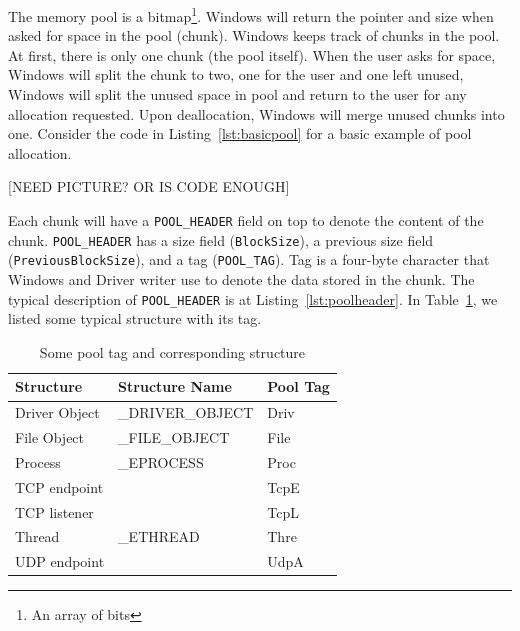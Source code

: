 The memory pool is a bitmap\footnote{An array of bits}. Windows will return the pointer and size when asked for space in the pool (chunk). Windows keeps track of chunks in the pool. At first, there is only one chunk (the pool itself). When the user asks for space, Windows will split the chunk to two, one for the user and one left unused, Windows will split the unused space in pool and return to the user for any allocation requested. Upon deallocation, Windows will merge unused chunks into one. Consider the code in Listing~\ref{lst:basicpool} for a basic example of pool allocation.

[NEED PICTURE? OR IS CODE ENOUGH]

Each chunk will have a \texttt{POOL\_HEADER} field on top to denote the content of the chunk. \texttt{POOL\_HEADER} has a size field (\texttt{BlockSize}), a previous size field (\texttt{PreviousBlockSize}), and a tag (\texttt{POOL\_TAG}). Tag is a four-byte character that Windows and Driver writer use to denote the data stored in the chunk. The typical description of \texttt{POOL\_HEADER} is at Listing~\ref{lst:poolheader}. In Table~\ref{tab:pooltag}, we listed some typical structure with its tag.





\begin{center}
\begin{table}[h]
\begin{tabular}{|l|l|l|}
\hline
Structure     & Structure Name   & Pool Tag \\ \hline
Driver Object & \_DRIVER\_OBJECT & Driv     \\ \hline
File Object   & \_FILE\_OBJECT   & File     \\ \hline
Process       & \_EPROCESS       & Proc     \\ \hline
TCP endpoint  &                  & TcpE     \\ \hline
TCP listener  &                  & TcpL     \\ \hline
Thread        & \_ETHREAD        & Thre     \\ \hline
UDP endpoint  &                  & UdpA     \\ \hline
\end{tabular}
\caption{Some pool tag and corresponding structure}
\label{tab:pooltag}
\end{table}
\end{center}

